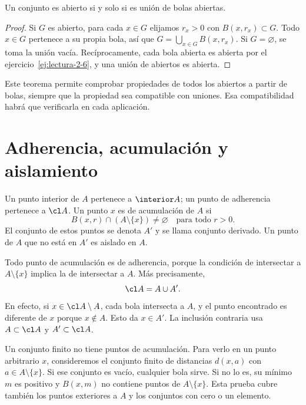 \begin{teorema}\label{ch03:unionbolas}
Un conjunto es abierto si y solo si es unión de bolas abiertas.
\end{teorema}
\begin{proof}
Si $G$ es abierto, para cada $x\in G$ elijamos $r_x>0$ con $B(x,r_x)\subset G$. Todo $x\in G$ pertenece a su propia bola, así que $G=\bigcup_{x\in G}B(x,r_x)$. Si $G=\varnothing$, se toma la unión vacía. Recíprocamente, cada bola abierta es abierta por el ejercicio~\ref{ej:lectura-2-6}, y una unión de abiertos es abierta.
\end{proof}
Este teorema permite comprobar propiedades de todos los abiertos a partir de bolas, siempre que la propiedad sea compatible con uniones. Esa compatibilidad habrá que verificarla en cada aplicación.

\section{Adherencia, acumulación y aislamiento}
\begin{definicion}
Un punto interior de $A$ pertenece a $\interior A$; un punto de adherencia pertenece a $\cl A$. Un punto $x$ es de acumulación de $A$ si
\[
B(x,r)\cap(A\setminus\{x\})\ne\varnothing\quad\text{para todo }r>0.
\]
El conjunto de estos puntos se denota $A'$ y se llama conjunto derivado. Un punto de $A$ que no está en $A'$ es aislado en $A$.
\end{definicion}
Todo punto de acumulación es de adherencia, porque la condición de intersectar a $A\setminus\{x\}$ implica la de intersectar a $A$. Más precisamente,
\begin{equation}\label{ch03:clderivada}
\cl A=A\cup A'.
\end{equation}
En efecto, si $x\in\cl A\setminus A$, cada bola intersecta a $A$, y el punto encontrado es diferente de $x$ porque $x\notin A$. Esto da $x\in A'$. La inclusión contraria usa $A\subset\cl A$ y $A'\subset\cl A$.

Un conjunto finito no tiene puntos de acumulación. Para verlo en un punto arbitrario $x$, consideremos el conjunto finito de distancias $d(x,a)$ con $a\in A\setminus\{x\}$. Si ese conjunto es vacío, cualquier bola sirve. Si no lo es, su mínimo $m$ es positivo y $B(x,m)$ no contiene puntos de $A\setminus\{x\}$. Esta prueba cubre también los puntos exteriores a $A$ y los conjuntos con cero o un elemento.

